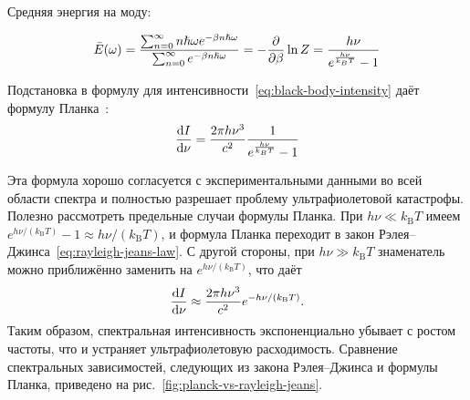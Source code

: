 \documentclass[a4paper, 12pt]{article}
\begin{document}
Средняя энергия на моду:

\[
\bar{E}(\omega) = \frac{\sum_{n=0}^\infty n \hslash \omega e^{-\beta n \hslash \omega}}{\sum_{n=0}^\infty e^{-\beta n \hslash \omega}} =
-\pdv{\beta} \ln Z = \frac{h\nu}{e^{\frac{h\nu}{k_B T}} - 1}
\]

Подстановка в формулу для интенсивности~\eqref{eq:black-body-intensity} даёт формулу Планка~\cite{Planck1900,Planck1901}:
\begin{equation}
\dv{I}{\nu} = \frac{2\pi h \nu^3}{c^2} \frac{1}{e^{\frac{h \nu}{k_B T}} - 1}
\end{equation}

Эта формула хорошо согласуется с экспериментальными данными во всей
области спектра и полностью разрешает проблему ультрафиолетовой катастрофы.
Полезно рассмотреть предельные случаи формулы Планка. При
$h\nu \ll k_{\mathrm B}T$ имеем
$e^{h\nu/(k_{\mathrm B}T)} - 1 \approx h\nu/(k_{\mathrm B}T)$, и формула
Планка переходит в закон Рэлея--Джинса~\eqref{eq:rayleigh-jeans-law}. С
другой стороны, при $h\nu \gg k_{\mathrm B}T$ знаменатель можно приближённо
заменить на $e^{h\nu/(k_{\mathrm B}T)}$, что даёт
\begin{equation}
  \dv{I}{\nu} \approx \frac{2\pi h \nu^3}{c^2} e^{-h\nu/(k_{\mathrm B}T)}.
\end{equation}
Таким образом, спектральная интенсивность экспоненциально убывает с ростом
частоты, что и устраняет ультрафиолетовую расходимость. Сравнение
спектральных зависимостей, следующих из закона Рэлея--Джинса и формулы
Планка, приведено на рис.~\ref{fig:planck-vs-rayleigh-jeans}.
\end{document}
